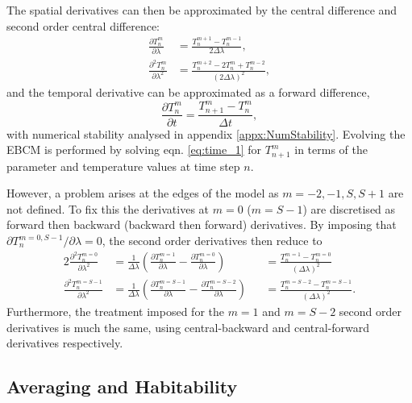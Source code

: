\documentclass[12pt, onecolumn]{revtex4-2}    %
\newcommand{\partialderiv}[2]{\frac{\partial {#1}}{\partial {#2}}}
\newcommand{\partialderivsecnd}[2]{\frac{\partial^2 {#1}}{\partial {#2}^2}}
\begin{document}
The spatial derivatives can then be approximated by the central difference and second order central difference:
\begin{align}
  \partialderiv{T^m_n}{\lambda}      & = \frac{T^{m+1}_n - T^{m-1}_n}{2 \Delta\lambda},             \label{eq:space_1} \\
  \partialderivsecnd{T^m_n}{\lambda} & = \frac{T^{m+2}_n -2T^m_n + T^{m-2}_n}{(2 \Delta\lambda)^2}, \label{eq:space_2}
\end{align} 
and the temporal derivative can be approximated as a forward difference,
\begin{equation}
  \partialderiv{T^m_n}{t} = \frac{T^m_{n+1} - T^m_n}{\Delta t},
  \label{eq:time_1}
\end{equation}
with numerical stability analysed in appendix \ref{appx:NumStability}.
Evolving the EBCM is performed by solving eqn. \eqref{eq:time_1} for $T^m_{n+1}$ in terms of the parameter and temperature values at time step $n$.

However, a problem arises at the edges of the model as $m=-2, -1, S, S+1$ are not defined.
To fix this the derivatives at $m=0$ ($m=S-1$) are discretised as forward then backward (backward then forward) derivatives.
By imposing that ${\partial T^{m=0, S-1}_n}/{\partial \lambda} = 0$, the second order derivatives then reduce to
\begin{alignat}{2}
  \partialderivsecnd{T^{m=0}_n}{\lambda}   & = \frac{1}{\Delta\lambda  }\left(\partialderiv{T^{m=1}_n}{\lambda} - \partialderiv{T^{m=0}_n}{\lambda}\right)    &  & = \frac{T^{m=1}_n - T^{m=0}_n}{(\Delta\lambda)^2}
  \label{eq:forward_backward}                                                                                                                                                                                     \\
  \partialderivsecnd{T^{m=S-1}_n}{\lambda} & = \frac{1}{\Delta\lambda  }\left(\partialderiv{T^{m=S-1}_n}{\lambda} - \partialderiv{T^{m=S-2}_n}{\lambda}\right) &  & = \frac{T^{m=S-2}_n - T^{m=S-1}_n}{(\Delta\lambda)^2}.
  \label{eq:backward_forward}
\end{alignat}
Furthermore, the treatment imposed for the $m=1$ and $m=S-2$ second order derivatives is much the same, using central-backward and central-forward derivatives respectively.

\subsection{Averaging and Habitability} \label{ssec:habiAver}
\end{document}
